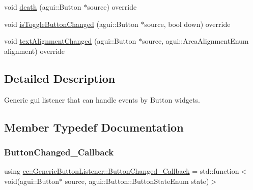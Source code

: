 \begin{DoxyCompactItemize}
\item 
void \mbox{\hyperlink{classec_1_1_generic_button_listener_a21f4b1a65d80f3f715a3f4ce51dce39e}{death}} (agui\+::\+Button $\ast$source) override
\item 
void \mbox{\hyperlink{classec_1_1_generic_button_listener_a23135a254fea72679eb994e5d6209a18}{is\+Toggle\+Button\+Changed}} (agui\+::\+Button $\ast$source, bool down) override
\item 
void \mbox{\hyperlink{classec_1_1_generic_button_listener_a314ef307095e669783157eeceb452ff6}{text\+Alignment\+Changed}} (agui\+::\+Button $\ast$source, agui\+::\+Area\+Alignment\+Enum alignment) override
\end{DoxyCompactItemize}


\subsection{Detailed Description}
Generic gui listener that can handle events by Button widgets. 

\subsection{Member Typedef Documentation}
\mbox{\label{classec_1_1_generic_button_listener_af89147c1baeadae9155f5d4e0df7abf3}} 
\subsubsection{\texorpdfstring{Button\+Changed\+\_\+\+Callback}{ButtonChanged\_Callback}}
{\footnotesize\ttfamily using \mbox{\hyperlink{classec_1_1_generic_button_listener_af89147c1baeadae9155f5d4e0df7abf3}{ec\+::\+Generic\+Button\+Listener\+::\+Button\+Changed\+\_\+\+Callback}} =  std\+::function$<$void(agui\+::\+Button$\ast$ source, agui\+::\+Button\+::\+Button\+State\+Enum state)$>$}

\mbox{\label{classec_1_1_generic_button_listener_aa7ca8b30098ab89eff663950d25a13eb}} 
